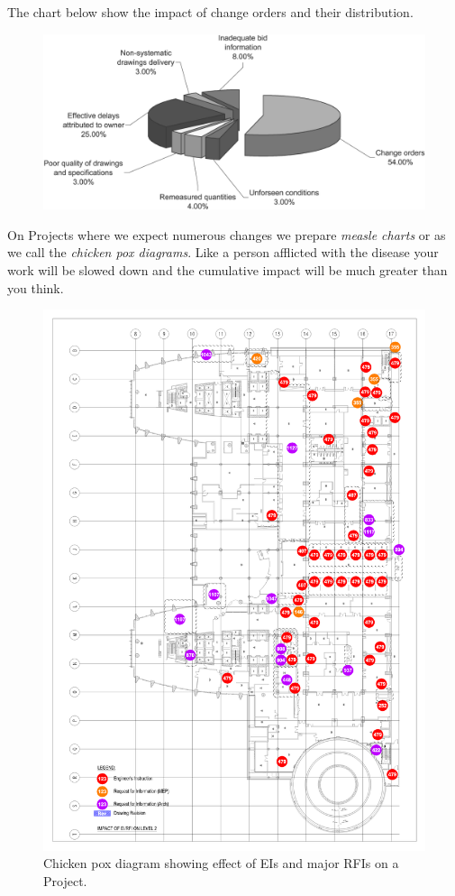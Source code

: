 The chart below show the impact of change orders and their distribution. 

\begin{figure}
\includegraphics[width=1.3\textwidth]{./graphics/change-orders}
\end{figure}

On Projects where we expect numerous changes we prepare \textit{measle charts}  or
as we call the \textit{chicken pox diagrams}. Like a person afflicted with the
disease your work will be slowed down and the cumulative impact will be much
greater than you think.


\begin{fullwidth}
\begin{figure}
\includegraphics[width=1.1\textwidth]{./graphics/AHU/cpL2}
\caption{Chicken pox diagram showing effect of EIs and major RFIs on a Project.}
\end{figure}
\end{fullwidth}


